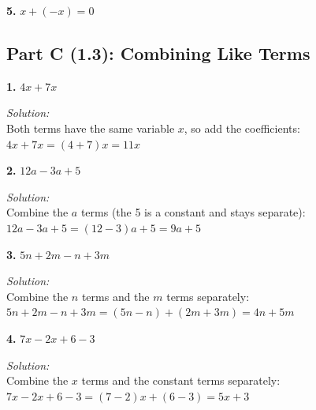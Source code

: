\documentclass[12pt]{article}
\begin{document}
                \vspace{0.5cm}

            \textbf{5.} $x + (-x) = 0$


                \newpage

        \subsection*{Part C (1.3): Combining Like Terms}

            \textbf{1.} $4x + 7x$

                \textit{Solution:}\\
                Both terms have the same variable $x$, so add the coefficients:\\
                $4x + 7x = (4 + 7)x = 11x$


                \vspace{0.5cm}

            \textbf{2.} $12a - 3a + 5$

                \textit{Solution:}\\
                Combine the $a$ terms (the 5 is a constant and stays separate):\\
                $12a - 3a + 5 = (12 - 3)a + 5 = 9a + 5$


                \vspace{0.5cm}

            \textbf{3.} $5n + 2m - n + 3m$

                \textit{Solution:}\\
                Combine the $n$ terms and the $m$ terms separately:\\
                $5n + 2m - n + 3m = (5n - n) + (2m + 3m) = 4n + 5m$


                \vspace{0.5cm}

            \textbf{4.} $7x - 2x + 6 - 3$

                \textit{Solution:}\\
                Combine the $x$ terms and the constant terms separately:\\
                $7x - 2x + 6 - 3 = (7 - 2)x + (6 - 3) = 5x + 3$
\end{document}
